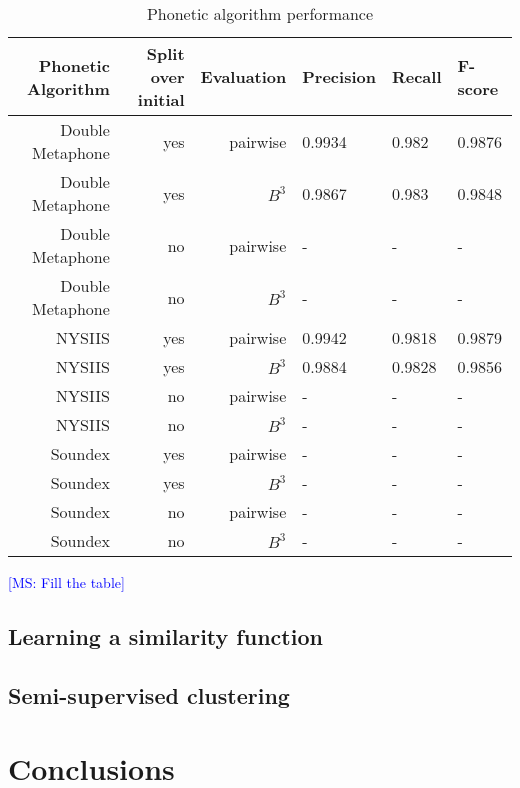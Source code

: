 \documentclass{article}
\newcommand{\msnote}[1]{\textcolor{blue}{[MS: #1]}}
\begin{document}
\FloatBarrier
\begin{table}[H]
\caption{Phonetic algorithm performance}
\centering
\begin{tabular}{|r|r|r|l|l|l|}
  \hline
  Phonetic Algorithm & Split over initial & Evaluation & Precision & Recall & F-score \\
  \hline
  Double Metaphone & yes & pairwise & 0.9934 & 0.982 & 0.9876 \\
  \hline
  Double Metaphone & yes & $B^3$ & 0.9867 & 0.983 & 0.9848 \\
  \hline
  Double Metaphone & no & pairwise & - & - & - \\
  \hline
  Double Metaphone & no & $B^3$ & - & - & - \\
  \hline
  NYSIIS & yes & pairwise & 0.9942 & 0.9818 & 0.9879 \\
  \hline
  NYSIIS & yes & $B^3$ & 0.9884 & 0.9828 & 0.9856 \\
  \hline
  NYSIIS & no & pairwise & - & - & - \\
  \hline
  NYSIIS & no & $B^3$ & - & - & - \\
  \hline
  Soundex & yes & pairwise & - & - & - \\
  \hline
  Soundex & yes & $B^3$ & - & - & - \\
  \hline
  Soundex & no & pairwise & - & - & - \\
  \hline
  Soundex & no & $B^3$ & - & - & - \\
  \hline
\end{tabular}
\end{table}

\msnote{Fill the table}


\subsection{Learning a similarity function}

\subsection{Semi-supervised clustering}



\section{Conclusions}
\label{conclusions}






\end{document}
